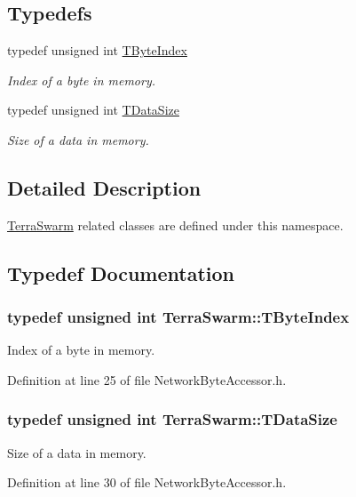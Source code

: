 \subsection*{Typedefs}
\begin{DoxyCompactItemize}
\item 
typedef unsigned int \hyperlink{namespace_terra_swarm_a5f9f404900316abc28c8bd2cbaa8fb4b}{T\-Byte\-Index}
\begin{DoxyCompactList}\small\item\em Index of a byte in memory. \end{DoxyCompactList}\item 
typedef unsigned int \hyperlink{namespace_terra_swarm_a092e6ec9739175076ae3106783f5c1b6}{T\-Data\-Size}
\begin{DoxyCompactList}\small\item\em Size of a data in memory. \end{DoxyCompactList}\end{DoxyCompactItemize}


\subsection{Detailed Description}
\hyperlink{namespace_terra_swarm}{Terra\-Swarm} related classes are defined under this namespace. 

\subsection{Typedef Documentation}
\hypertarget{namespace_terra_swarm_a5f9f404900316abc28c8bd2cbaa8fb4b}{
\subsubsection[{T\-Byte\-Index}]{\setlength{\rightskip}{0pt plus 5cm}typedef unsigned int {\bf Terra\-Swarm\-::\-T\-Byte\-Index}}}\label{namespace_terra_swarm_a5f9f404900316abc28c8bd2cbaa8fb4b}


Index of a byte in memory. 



Definition at line 25 of file Network\-Byte\-Accessor.\-h.

\hypertarget{namespace_terra_swarm_a092e6ec9739175076ae3106783f5c1b6}{
\subsubsection[{T\-Data\-Size}]{\setlength{\rightskip}{0pt plus 5cm}typedef unsigned int {\bf Terra\-Swarm\-::\-T\-Data\-Size}}}\label{namespace_terra_swarm_a092e6ec9739175076ae3106783f5c1b6}


Size of a data in memory. 



Definition at line 30 of file Network\-Byte\-Accessor.\-h.

